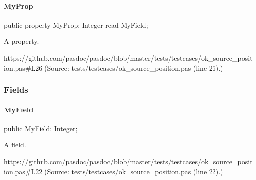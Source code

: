 \documentclass{report}
\begin{document}
\paragraph*{MyProp}\hspace*{\fill}

\begin{list}{}{
\setlength{\itemindent}{0cm}
\setlength{\listparindent}{0cm}
\setlength{\leftmargin}{\evensidemargin}
\addtolength{\leftmargin}{\tmplength}
\settowidth{\labelsep}{X}
\addtolength{\leftmargin}{\labelsep}
\setlength{\labelwidth}{\tmplength}
}
\begin{flushleft}
\item[\textbf{Declaration}\hfill]
\begin{ttfamily}
public property MyProp: Integer read MyField;\end{ttfamily}


\end{flushleft}
\par
\item[\textbf{Description}]
A property.\par
https://github.com/pasdoc/pasdoc/blob/master/tests/testcases/ok{\_}source{\_}position.pas{\#}L26 (Source: tests/testcases/ok{\_}source{\_}position.pas (line 26).)

\end{list}
\subsubsection*{\large{\textbf{Fields}}\normalsize\hspace{1ex}\hfill}
\paragraph*{MyField}\hspace*{\fill}

\begin{list}{}{
\setlength{\itemindent}{0cm}
\setlength{\listparindent}{0cm}
\setlength{\leftmargin}{\evensidemargin}
\addtolength{\leftmargin}{\tmplength}
\settowidth{\labelsep}{X}
\addtolength{\leftmargin}{\labelsep}
\setlength{\labelwidth}{\tmplength}
}
\begin{flushleft}
\item[\textbf{Declaration}\hfill]
\begin{ttfamily}
public MyField: Integer;\end{ttfamily}


\end{flushleft}
\par
\item[\textbf{Description}]
A field.\par
https://github.com/pasdoc/pasdoc/blob/master/tests/testcases/ok{\_}source{\_}position.pas{\#}L22 (Source: tests/testcases/ok{\_}source{\_}position.pas (line 22).)

\end{list}
\end{document}
